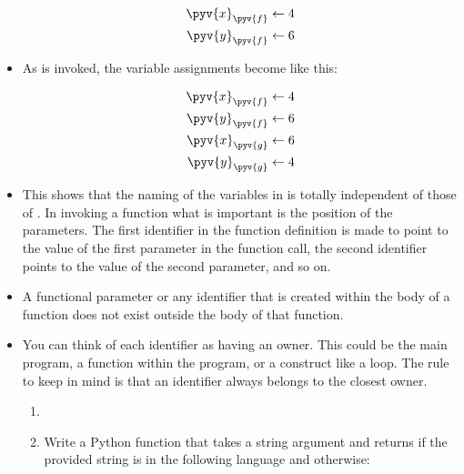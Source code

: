 \documentclass[a4paper]{article}
\begin{document}
\begin{itemize}
\begin{align*}
\pyv{x}_{\pyv{f}} \leftarrow 4\\
\pyv{y}_{\pyv{f}}\leftarrow 6
\end{align*}

\item As  is invoked, the variable assignments become like this:

\begin{align*}
\pyv{x}_{\pyv{f}} \leftarrow 4\\
\pyv{y}_{\pyv{f}}\leftarrow 6\\
\pyv{x}_{\pyv{g}} \leftarrow 6\\
\pyv{y}_{\pyv{g}}\leftarrow 4
\end{align*}

\item This shows that the naming of the variables in  is totally
independent of those of . In invoking a function what is important is the
position of the parameters. The first identifier in the function definition is
made to point to the value of the first parameter in the function call, the
second identifier points to the value of the second parameter, and so on. 

\item A functional parameter or any identifier that is created within the body
of a function does not exist outside the body of that function.

\item You can think of each identifier as having an owner. This could be the
main program, a function within the program, or a construct like a 
loop. The rule to keep in mind is that an identifier always belongs to the
closest owner. 

% 
% 




\begin{uexercise}

\begin{enumerate}
\item[]
\item Write a Python function  that takes a string argument and
returns  if the provided string is in the following language and
 otherwise:


\end{enumerate}
\end{uexercise}
\end{itemize}
\end{document}
